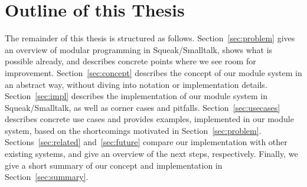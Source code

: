 \section{Outline of this Thesis}
The remainder of this thesis is structured as follows. Section~\ref{sec:problem} gives an overview of modular programming in Squeak/Smalltalk, shows what is possible already, and describes concrete points where we see room for improvement. Section~\ref{sec:concept} describes the concept of our module system in an abstract way, without diving into notation or implementation details. Section~\ref{sec:impl} describes the implementation of our module system in Squeak/Smalltalk, as well as corner cases and pitfalls. Section~\ref{sec:usecases} describes concrete use cases and provides examples, implemented in our module system, based on the shortcomings motivated in Section~\ref{sec:problem}. Sections~\ref{sec:related} and~\ref{sec:future} compare our implementation with other existing systems, and give an overview of the next steps, respectively. Finally, we give a short summary of our concept and implementation in Section~\ref{sec:summary}.
